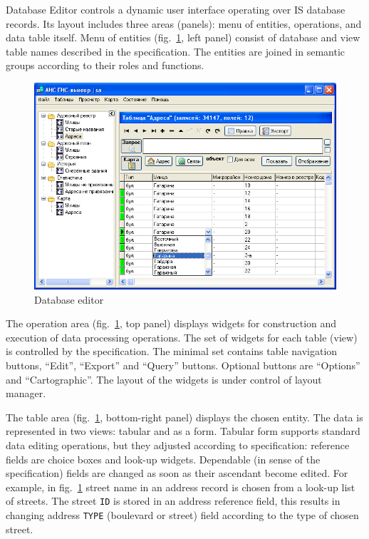 \documentclass[conference]{IEEEtran}
\begin{document}
Database Editor controls a dynamic user interface operating over IS database records.  Its layout includes three areas (panels): menu of entities, operations, and data table itself.  Menu of entities (fig.~\ref{fig:dbeditor}, left panel) consist of database and view table names described in the specification.  The entities are joined in semantic groups according to their roles and functions.

\begin{figure}[bH]
  \centering
  \includegraphics[width=\linewidth]{dbeditor.png}
  \caption{Database editor}
  \label{fig:dbeditor}
\end{figure}

The operation area (fig.~\ref{fig:dbeditor}, top panel) displays widgets for construction and execution of data processing operations.  The set of widgets for each table (view) is controlled by the specification.  The minimal set contains table navigation buttons, ``Edit'', ``Export'' and ``Query'' buttons.  Optional buttons are ``Options'' and ``Cartographic''.  The layout of the widgets is under control of layout manager.

The table area (fig.~\ref{fig:dbeditor}, bottom-right panel) displays the chosen entity.  The data is represented in two views: tabular and as a form.  Tabular form supports standard data editing operations, but they adjusted according to specification: reference fields are choice boxes and look-up widgets.  Dependable (in sense of the specification) fields are changed as soon as their ascendant become edited.  For example, in fig.~\ref{fig:dbeditor} street name in an address record is chosen from a look-up list of streets.  The street \texttt{ID} is stored in an address reference field, this results in changing address \texttt{TYPE} (boulevard or street) field according to the type of chosen street.
\end{document}
